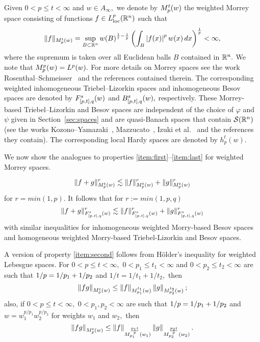  Given $0<p\le t<\infty$ and $w\in A_\infty,$  we denote by $\mow{p}{t}{w}$ the weighted Morrey space consisting of functions $f\in L^p_{\text{loc}}(\rn)$  such that
\[
\|f\|_{\mow{p}{t}{w}}=\sup_{B\subset \rn}w(B)^{\frac{1}{t}-\frac{1}{p}}\left( \int_B\abs{f(x)}^pw(x)\dx\right)^\frac{1}{p}<\infty,
\]
where the supremum is taken over all Euclidean balls $B$ contained in $\rn.$ We note that $\mow{p}{p}{w}=\lebw{p}{w}.$ For more details on Morrey spaces see the work Rosenthal--Schmeisser~\cite{MR3538648} and the references contained therein. The corresponding weighted inhomogeneous Triebel--Lizorkin spaces and inhomogeneous Besov spaces  are denoted by $\itlw{[p,t]}{s}{q}{w}$ and   $\ibesw{[p,t]}{s}{q}{w},$ respectively. These Morrey-based Triebel--Lizorkin and Besov  spaces are independent of the choice of $\varphi$ and $\psi$ given in  Section~\ref{sec:spaces} and are quasi-Banach spaces that contain $\sw$ (see the works Kozono--Yamazaki~\cite{MR1274547}, Mazzucato~\cite{MR1946395}, Izuki et al.~\cite{MR2792058} and the references they contain). The corresponding local Hardy spaces are denoted by $h^t_p(w).$ 

We now show the analogues to properties \ref{item:first}--\ref{item:last} for weighted Morrey spaces.

\[\|f+g\|^r_{\mow{p}{t}{w}} \lesssim \|f\|^r_{\mow{p}{t}{w}} + \|g\|^r_{\mow{p}{t}{w}} \]
for $r = min(1,p)$. It follows that for $r :=min(1,p,q)$ 
\[ \|f+g\|^r_{\itlw{[p,t]}{s}{q}{w}} \lesssim \|f\|^r_{\itlw{[p,t]}{s}{q}{w}} + \|g\|^r_{\itlw{[p,t]}{s}{q}{w}} \]
with similar inequalities for inhomogeneous weighted Morry-based Besov spaces and homogeneous weighted Morry-based Triebel-Lizorkin and Besov spaces.

A version of property \ref{item:second} follows from H\"older's inequality for weighted Lebesgue spaces. For $0<p\le t<\infty,$ $0<p_1\le t_1<\infty$ and $0<p_2\le t_2<\infty$ are such that $\hcline$ and $1/t=1/t_1+1/t_2,$ then  
\begin{equation*}
\norm{fg}{\mow{p}{t}{w}}\le \norm{f}{\mow{p_1}{t_1}{w}} \norm{g}{\mow{p_2}{t_2}{w}};
\end{equation*}
also, if $0<p\le t<\infty,$ $0<p_1,p_2<\infty$ are such that $\hcline$ and $w=w_1^{p/p_1}w_2^{p/p_2}$ for weights $w_1$ and $w_2,$ then 
\begin{equation*}
\norm{fg}{\mow{p}{t}{w}}\le \norm{f}{\mow{p_1}{\frac{p_1t}{p}}{w_1}} \norm{g}{\mow{p_2}{\frac{p_2t}{p}}{w_2}}.
\end{equation*}

